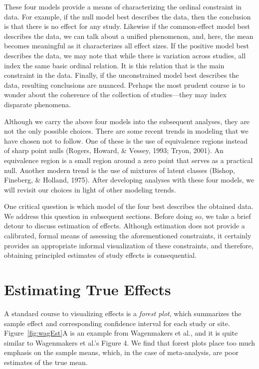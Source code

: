 \documentclass[english,man]{apa6}
\theoremstyle{definition}
\theoremstyle{definition}
\theoremstyle{definition}
\theoremstyle{remark}
\begin{document}
These four models provide a means of characterizing the ordinal
constraint in data. For example, if the null model best describes the
data, then the conclusion is that there is no effect for any study.
Likewise if the common-effect model best describes the data, we can talk
about a unified phenomenon, and, here, the mean becomes meaningful as it
characterizes all effect sizes. If the positive model best describes the
data, we may note that while there is variation across studies, all
index the same basic ordinal relation. It is this relation that is the
main constraint in the data. Finally, if the unconstrained model best
describes the data, resulting conclusions are nuanced. Perhaps the most
prudent course is to wonder about the coherence of the collection of
studies---they may index disparate phenomena.

Although we carry the above four models into the subsequent analyses,
they are not the only possible choices. There are some recent trends in
modeling that we have chosen not to follow. One of these is the use of
equivalence regions instead of sharp point nulls (Rogers, Howard, \&
Vessey, 1993; Tryon, 2001). An equivalence region is a small region
around a zero point that serves as a practical null. Another modern
trend is the use of mixtures of latent classes (Bishop, Fineberg, \&
Holland, 1975). After developing analyses with these four models, we
will revisit our choices in light of other modeling trends.

One critical question is which model of the four best describes the
obtained data. We address this question in subsequent sections. Before
doing so, we take a brief detour to discuss estimation of effects.
Although estimation does not provide a calibrated, formal means of
assessing the aforementioned constraints, it certainly provides an
appropriate informal visualization of these constraints, and therefore,
obtaining principled estimates of study effects is consequential.

\section{Estimating True Effects}\label{estimating-true-effects}

A standard course to visualizing effects is a \emph{forest plot}, which
summarizes the sample effect and corresponding confidence interval for
each study or site. Figure~\ref{fig:wagEst}A is an example from
Wagenmakers et al., and it is quite similar to Wagenmakers et al.'s
Figure 4. We find that forest plots place too much emphasis on the
sample means, which, in the case of meta-analysis, are poor estimates of
the true mean.
\end{document}
